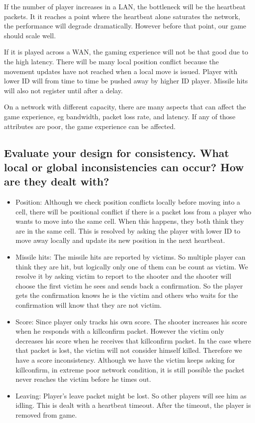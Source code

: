 \documentclass[11pt]{article} %
\begin{document}
If the number of player increases in a LAN, the bottleneck will be the heartbeat packets.
It it reaches a point where the heartbeat alone saturates the network, the performance will
degrade dramatically. However before that point, our game should scale well.

If it is played across a WAN, the gaming experience will not be that good due to the high latency.
There will be many local position conflict because the movement updates have not reached when
a local move is issued. Player with lower ID will from time to time be pushed away by higher ID player.
Missile hits will also not register until after a delay.

On a network with different capacity, there are many aspects that can affect the game experience, eg
bandwidth, packet loss rate, and latency. If any of those attributes are poor, the game experience
can be affected.


\subsection{Evaluate your design for consistency. 
What local or global inconsistencies can occur? How are they dealt with?}

\begin{itemize}
    \item Position: Although we check position conflicts locally before moving into a cell, there
        will be positional conflict if there is a packet loss from a player who wants to move into
        the same cell. When this happens, they both think they are in the same cell. This is resolved
        by asking the player with lower ID to move away locally and update its new position in the
        next heartbeat.
    \item Missile hits: The missile hits are reported by victims. So multiple player can think they are
        hit, but logically only one of them can be count as victim. We resolve it by asking victim to
        report to the shooter and the shooter will choose the first victim he sees and sends back 
        a confirmation. So the player gets the confirmation knows he is the victim and others who waits
        for the confirmation will know that they are not victim.
    \item Score: Since player only tracks his own score. The shooter increases his score when he
        responds with a killconfirm packet. However the victim only decreases his score when he
        receives that killconfirm packet. In the case where that packet is lost, the victim
        will not consider himself killed. Therefore we have a score inconsistency. Although we have
        the victim keeps asking for killconfirm, in extreme poor network condition, it is still possible
        the packet never reaches the victim before he times out.
    \item Leaving: Player's leave packet might be lost. So other players will see him as idling. This
        is dealt with a heartbeat timeout. After the timeout, the player is removed from game.
\end{itemize}
\end{document}
